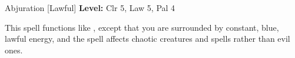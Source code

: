 {Abjuration [Lawful]}
{
	\textbf{Level:}
	Clr 5, Law 5, Pal 4\\
}
{
	This spell functions like , except that you are surrounded by constant, blue, lawful energy, and the spell affects chaotic creatures and spells rather than evil ones.

}
